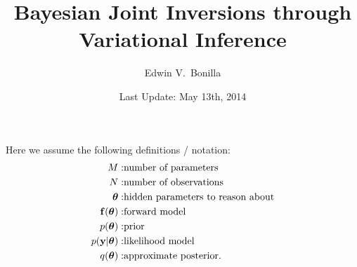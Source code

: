 \documentclass[11pt,a4paper]{article}
\title{Bayesian Joint Inversions through Variational Inference}
\author{Edwin V.~Bonilla}
\date{Last Update: May 13th, 2014}
\begin{document}
\maketitle

Here we assume the following definitions / notation:
\begin{align}
	M: & \text{number of parameters} \\
	N: & \text{number of observations} \\
	\boldsymbol{ \theta }: & \text{hidden parameters to reason about} \\ 
	\mathbf{f}(\boldsymbol{ \theta }): & \text{forward model} \\ 
	p(\boldsymbol{ \theta }): & \text{prior} \\
	p(\mathbf{y}|\boldsymbol{ \theta }): & \text{likelihood model} \\ 
	q(\boldsymbol{ \theta }): & \text{approximate posterior} \text{.}
\end{align}



\pagebreak





\end{document}
